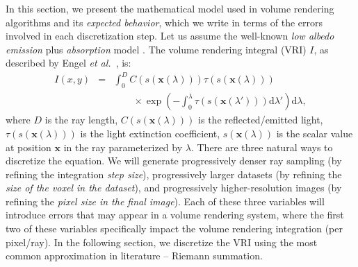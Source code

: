 In this section, we present the mathematical model used in volume
rendering algorithms and its \emph{expected behavior}, which we write
in terms of the errors involved in each discretization step.  Let us
assume the well-known \emph{low albedo} \emph{emission} plus
\emph{absorption} model \cite{Max95}.  The volume rendering integral
(VRI) $I$, as described by Engel \emph{et al.}~\cite{Engel01}, is:
\begin{eqnarray}
I(x,y) &=& \int_0^D C(s(\mathbf{x}(\lambda)))
\tau(s(\mathbf{x}(\lambda))) \nonumber \\
&& \label{eq:emission_absorption}  \qquad \times \exp\left(-\int_0^\lambda
\tau(s(\mathbf{x}(\lambda'))) \mathrm{d}\lambda'\right)\mathrm{d}\lambda,
\label{eq:volume-rendering-equation}
\end{eqnarray}
where $D$ is the ray length, $C(s(\mathbf{x}(\lambda)))$ is the
reflected/emitted light, $\tau(s(\mathbf{x}(\lambda)))$ is the light
extinction coefficient, $s(\mathbf{x}(\lambda))$ is the scalar value
at position $\mathbf{x}$ in the ray parameterized by $\lambda$.  There
are three natural ways to discretize the equation. We will generate
progressively denser ray sampling (by refining the integration
\emph{step size}), progressively larger datasets (by refining the
\emph{size of the voxel in the dataset}), and progressively
higher-resolution images (by refining the \emph{pixel size in the
  final image}). Each of these three variables will introduce errors
that may appear in a volume rendering system, where the first two of these
variables specifically impact the volume rendering integration (per pixel/ray).
In the following section, we discretize the VRI using
the most common approximation in literature -- Riemann summation.


